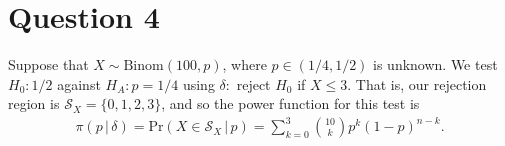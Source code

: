 \documentclass[10pt]{article}
\begin{document}
\section{Question 4} \noindent
Suppose that \(X \sim \mathrm{Binom}(100, p)\), where \(p \in (1/4, 1/2)\) is unknown. We test \(H_0 : 1/2\) against \(H_A : p = 1/4\) using \(\delta :\) 
reject \(H_0\) if \(X \le 3\). That is, our rejection region is \(\mathcal{S}_X = \{0,1,2,3\}\), and so the power function for this test is 
\begin{align*}
    \pi(p \,|\, \delta)
    = \mathrm{Pr}(X \in \mathcal{S}_X \,|\, p)
    = \sum_{k=0}^3 \binom{10}{k} p^k (1 - p)^{n - k}.
\end{align*}

\end{document}
